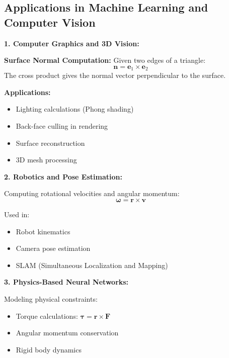 \documentclass[12pt,a4paper]{article}
\theoremstyle{definition}
\begin{document}
\subsection{Applications in Machine Learning and Computer Vision}

\begin{tcolorbox}[enhanced,breakable,colback=purple!5!white,colframe=purple!75!black,title=ML/DL Applications of Cross Product]

\textbf{1. Computer Graphics and 3D Vision:}

\textbf{Surface Normal Computation:}
Given two edges of a triangle:
\begin{equation}
\mathbf{n} = \mathbf{e}_1 \times \mathbf{e}_2
\end{equation}
The cross product gives the normal vector perpendicular to the surface.

\textbf{Applications:}
\begin{itemize}
    \item Lighting calculations (Phong shading)
    \item Back-face culling in rendering
    \item Surface reconstruction
    \item 3D mesh processing
\end{itemize}

\textbf{2. Robotics and Pose Estimation:}

Computing rotational velocities and angular momentum:
\begin{equation}
\boldsymbol{\omega} = \mathbf{r} \times \mathbf{v}
\end{equation}

Used in:
\begin{itemize}
    \item Robot kinematics
    \item Camera pose estimation
    \item SLAM (Simultaneous Localization and Mapping)
\end{itemize}

\textbf{3. Physics-Based Neural Networks:}

Modeling physical constraints:
\begin{itemize}
    \item Torque calculations: $\boldsymbol{\tau} = \mathbf{r} \times \mathbf{F}$
    \item Angular momentum conservation
    \item Rigid body dynamics
\end{itemize}


\end{tcolorbox}
\end{document}
